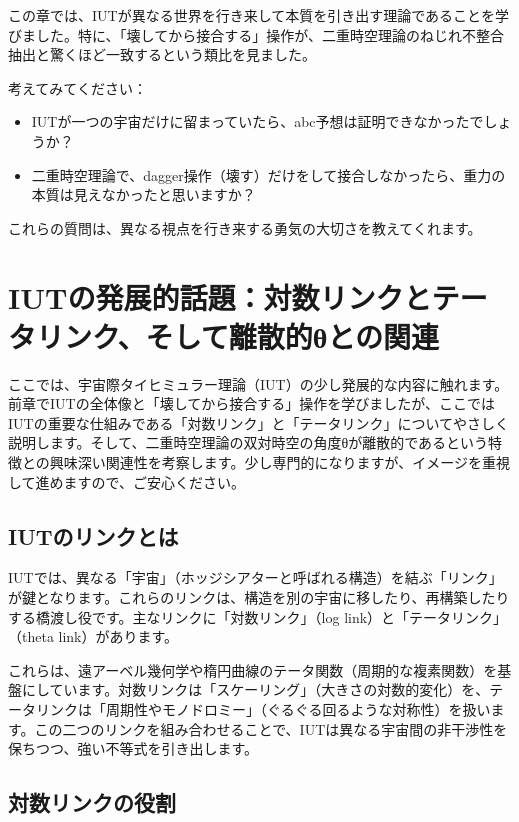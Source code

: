 \documentclass[dvipdfmx,12pt,a4paper]{jsarticle}
\begin{document}
この章では、IUTが異なる世界を行き来して本質を引き出す理論であることを学びました。特に、「壊してから接合する」操作が、二重時空理論のねじれ不整合抽出と驚くほど一致するという類比を見ました。

考えてみてください：
\begin{itemize}
  \item IUTが一つの宇宙だけに留まっていたら、abc予想は証明できなかったでしょうか？
  \item 二重時空理論で、dagger操作（壊す）だけをして接合しなかったら、重力の本質は見えなかったと思いますか？
\end{itemize}

これらの質問は、異なる視点を行き来する勇気の大切さを教えてくれます。

\section{IUTの発展的話題：対数リンクとテータリンク、そして離散的θとの関連}

ここでは、宇宙際タイヒミュラー理論（IUT）の少し発展的な内容に触れます。前章でIUTの全体像と「壊してから接合する」操作を学びましたが、ここではIUTの重要な仕組みである「対数リンク」と「テータリンク」についてやさしく説明します。そして、二重時空理論の双対時空の角度θが離散的であるという特徴との興味深い関連性を考察します。少し専門的になりますが、イメージを重視して進めますので、ご安心ください。

\subsection{IUTのリンクとは}

IUTでは、異なる「宇宙」（ホッジシアターと呼ばれる構造）を結ぶ「リンク」が鍵となります。これらのリンクは、構造を別の宇宙に移したり、再構築したりする橋渡し役です。主なリンクに「対数リンク」（log link）と「テータリンク」（theta link）があります。

これらは、遠アーベル幾何学や楕円曲線のテータ関数（周期的な複素関数）を基盤にしています。対数リンクは「スケーリング」（大きさの対数的変化）を、テータリンクは「周期性やモノドロミー」（ぐるぐる回るような対称性）を扱います。この二つのリンクを組み合わせることで、IUTは異なる宇宙間の非干渉性を保ちつつ、強い不等式を引き出します。

\subsection{対数リンクの役割}
\end{document}
